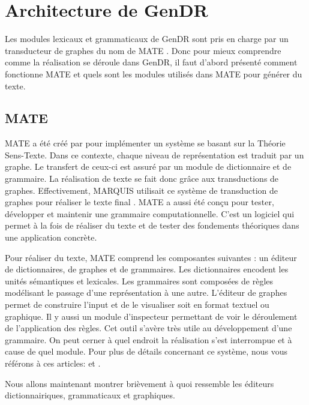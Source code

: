 \section{Architecture de GenDR}

Les modules lexicaux et grammaticaux de GenDR sont pris en charge par un transducteur de graphes du nom de MATE \citep{BohnetDevelopmentEnvironmentMTTbased2000}. Donc pour mieux comprendre comme la réalisation se déroule dans GenDR, il faut d'abord présenté comment fonctionne MATE et quels sont les modules utilisés dans MATE pour générer du texte.

\subsection{MATE}
MATE a été créé par \cite{BohnetDevelopmentEnvironmentMTTbased2000} pour implémenter un système se basant sur la Théorie Sens-Texte. Dans ce contexte, chaque niveau de représentation est traduit par un graphe. Le transfert de ceux-ci est assuré par un module de dictionnaire et de grammaire. La réalisation de texte se fait donc grâce aux transductions de graphes. Effectivement, MARQUIS utilisait ce système de transduction de graphes pour réaliser le texte final \citep{Lareau2007TowardsAG}. MATE a aussi été conçu pour tester, développer et maintenir une grammaire computationnelle. C'est un logiciel qui permet à la fois de réaliser du texte et de tester des fondements théoriques dans une application concrète. 

Pour réaliser du texte, MATE comprend les composantes suivantes : un éditeur de dictionnaires, de graphes et de grammaires. Les dictionnaires encodent les unités sémantiques et lexicales. Les grammaires sont composées de règles modélisant le passage d'une représentation à une autre. L'éditeur de graphes permet de construire l'input et de le visualiser soit en format textuel ou graphique. Il y aussi un module d'inspecteur permettant de voir le déroulement de l'application des règles. Cet outil s'avère très utile au développement d'une grammaire. On peut cerner à quel endroit la réalisation s'est interrompue et à cause de quel module. Pour plus de détails concernant ce système, nous vous référons à ces articles: \citep{BohnetOpensourcegraph2010} et \citep{LambreyImplementationcollocationspour2017}.

Nous allons maintenant montrer brièvement à quoi ressemble les éditeurs dictionnairiques, grammaticaux et graphiques.

